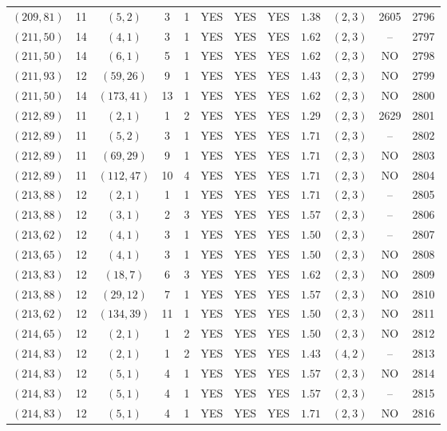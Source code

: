 \begin{longtable}{|c|c|c|c|c|c|c|c|c|c|c|c|}
$(209,81)$ & 11 & $(5,2)$ & 3 & 1 & YES & YES & YES & $1.38$ & $(2,3)$ & 2605 & 2796\\
$(211,50)$ & 14 & $(4,1)$ & 3 & 1 & YES & YES & YES & $1.62$ & $(2,3)$ & -- & 2797\\
$(211,50)$ & 14 & $(6,1)$ & 5 & 1 & YES & YES & YES & $1.62$ & $(2,3)$ & NO & 2798\\
$(211,93)$ & 12 & $(59,26)$ & 9 & 1 & YES & YES & YES & $1.43$ & $(2,3)$ & NO & 2799\\
$(211,50)$ & 14 & $(173,41)$ & 13 & 1 & YES & YES & YES & $1.62$ & $(2,3)$ & NO & 2800\\
$(212,89)$ & 11 & $(2,1)$ & 1 & 2 & YES & YES & YES & $1.29$ & $(2,3)$ & 2629 & 2801\\
$(212,89)$ & 11 & $(5,2)$ & 3 & 1 & YES & YES & YES & $1.71$ & $(2,3)$ & -- & 2802\\
$(212,89)$ & 11 & $(69,29)$ & 9 & 1 & YES & YES & YES & $1.71$ & $(2,3)$ & NO & 2803\\
$(212,89)$ & 11 & $(112,47)$ & 10 & 4 & YES & YES & YES & $1.71$ & $(2,3)$ & NO & 2804\\
$(213,88)$ & 12 & $(2,1)$ & 1 & 1 & YES & YES & YES & $1.71$ & $(2,3)$ & -- & 2805\\
$(213,88)$ & 12 & $(3,1)$ & 2 & 3 & YES & YES & YES & $1.57$ & $(2,3)$ & -- & 2806\\
$(213,62)$ & 12 & $(4,1)$ & 3 & 1 & YES & YES & YES & $1.50$ & $(2,3)$ & -- & 2807\\
$(213,65)$ & 12 & $(4,1)$ & 3 & 1 & YES & YES & YES & $1.50$ & $(2,3)$ & NO & 2808\\
$(213,83)$ & 12 & $(18,7)$ & 6 & 3 & YES & YES & YES & $1.62$ & $(2,3)$ & NO & 2809\\
$(213,88)$ & 12 & $(29,12)$ & 7 & 1 & YES & YES & YES & $1.57$ & $(2,3)$ & NO & 2810\\
$(213,62)$ & 12 & $(134,39)$ & 11 & 1 & YES & YES & YES & $1.50$ & $(2,3)$ & NO & 2811\\
$(214,65)$ & 12 & $(2,1)$ & 1 & 2 & YES & YES & YES & $1.50$ & $(2,3)$ & NO & 2812\\
$(214,83)$ & 12 & $(2,1)$ & 1 & 2 & YES & YES & YES & $1.43$ & $(4,2)$ & -- & 2813\\
$(214,83)$ & 12 & $(5,1)$ & 4 & 1 & YES & YES & YES & $1.57$ & $(2,3)$ & NO & 2814\\
$(214,83)$ & 12 & $(5,1)$ & 4 & 1 & YES & YES & YES & $1.57$ & $(2,3)$ & -- & 2815\\
$(214,83)$ & 12 & $(5,1)$ & 4 & 1 & YES & YES & YES & $1.71$ & $(2,3)$ & NO & 2816\\

\end{longtable}
